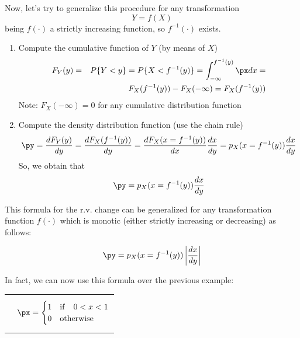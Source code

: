 Now, let's try to generalize this procedure for any transformation
$$ Y = f(X) $$
being $f(\cdot)$ a strictly increasing function, so $f^{-1}(\cdot)$ exists.
\begin{enumerate}
    \item Compute the cumulative function of $Y$ (by means of $X$)
    \begin{eqnarray} 
    F_Y(y)  &= &  P\{Y<y\} =  P\{X<f^{-1}(y)\} = \int_{-\infty}^{f^{-1}(y)} \px dx = \nonumber \\ 
    & & F_X(f^{-1}(y)) - F_X(-\infty) = F_X(f^{-1}(y)) \nonumber
    \end{eqnarray} 
  Note: $F_X(-\infty) = 0$ for any cumulative distribution function  
    \item Compute the density distribution function (use the chain rule)
    \begin{eqnarray} 
    \py = \frac{d F_Y(y)}{dy} =  \frac{d F_X(f^{-1}(y))}{dy} = \frac{d F_X(x= f^{-1}(y))}{dx}  \frac{dx}{dy} = p_X(x= f^{-1}(y)) \frac{dx}{dy} \nonumber
    \end{eqnarray} 
    So, we obtain that 
    \begin{eqnarray}  \py = p_X(x= f^{-1}(y)) \frac{dx}{dy}  \nonumber \end{eqnarray} 
\end{enumerate}

This formula for the r.v. change can be generalized for any transformation function $f(\cdot)$ which is monotic (either strictly increasing or decreasing) as follows:
\begin{svgraybox}
\begin{eqnarray} 
\py = p_X(x = f^{-1}(y))  \left| \frac{dx}{dy}\right| \label{eq:changeRV}
\end{eqnarray} 
\end{svgraybox}

In fact, we can now use this formula over the previous example:
\begin{center}
\begin{tabular}{m{}m{}}
 \raisebox{-0.25ex}{$ Y = X^2$} &
 \begin{equation} 
\px = \begin{cases}
1 & {\rm if} \quad 0<x<1\\
0 & {\rm otherwise} 
\end{cases} \nonumber
\end{equation}
\end{tabular}
\end{center}



